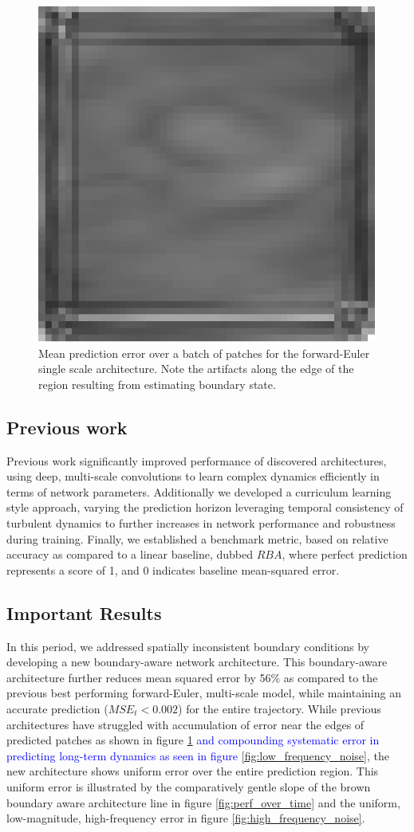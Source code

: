 \documentclass[12pt]{article}
\theoremstyle{plain}
\theoremstyle{remark}
\theoremstyle{definition}
\begin{document}
\begin{figure}
	\centering
	\includegraphics[width=0.2\linewidth]{conv_error}
	\caption{Mean prediction error over a batch of patches for the forward-Euler single scale architecture. Note the artifacts along the edge of the region resulting from estimating boundary state.}
	\label{fig:conv_mean_error}
\end{figure}



\subsection{Previous work}

Previous work significantly improved performance of discovered architectures, using deep, multi-scale convolutions to learn complex dynamics efficiently in terms of network parameters. Additionally we developed a curriculum learning style approach, varying the prediction horizon leveraging temporal consistency of turbulent dynamics to further increases in network performance and robustness during training. Finally, we established a benchmark metric, based on relative accuracy as compared to a linear baseline, dubbed $RBA$, where perfect prediction represents a score of 1, and 0 indicates baseline mean-squared error.



\subsection{Important Results}
In this period, we addressed spatially inconsistent boundary conditions by developing a new boundary-aware network architecture. This boundary-aware architecture further reduces mean squared error by 56\% as compared to the previous best performing forward-Euler, multi-scale model, while maintaining an accurate prediction ($MSE_t < 0.002$) for the entire trajectory. While previous architectures have struggled with accumulation of error near the edges of predicted patches as shown in figure \ref{fig:conv_mean_error} \textcolor{blue}{ and compounding systematic error in predicting long-term dynamics as seen in figure \ref{fig:low_frequency_noise}}, the new architecture shows uniform error over the entire prediction region. This uniform error is illustrated by the comparatively gentle slope of the brown boundary aware architecture line in figure \ref{fig:perf_over_time} and the uniform, low-magnitude, high-frequency error in figure \ref{fig:high_frequency_noise}.
 
\end{document}
